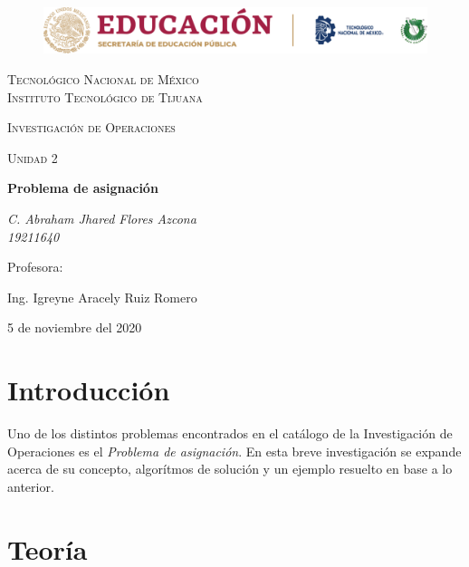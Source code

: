 \documentclass[letterpaper, 12pt]{article}
\begin{document}
    
    \begin{titlepage}
        \begin{figure}[ht]
            \centering
            \includegraphics[width=15cm]{logosITT.png}
        \end{figure}
        \centering
        {\scshape\LARGE Tecnológico Nacional de México\\Instituto Tecnológico de Tijuana\par}
        \vspace{1cm}
        {\scshape\Large Investigación de Operaciones\par}
        \vspace{1cm}
        {\scshape\Large Unidad 2\par}
        \vspace{1.5cm}
        {\huge\bfseries Problema de asignación\par}
        \vspace{2cm}
        {\Large\itshape C. Abraham Jhared Flores Azcona\\19211640\par}
        \vfill
        Profesora: \par
        Ing. Igreyne Aracely Ruiz Romero
        
        \vfill

        {\large 5 de noviembre del 2020}
    \end{titlepage}

    \newpage
    \thispagestyle{empty}
    \tableofcontents
    \listoffigures

    \newpage
    \section{Introducción}
    Uno de los distintos problemas encontrados en el catálogo de la Investigación de Operaciones es el \emph{Problema de asignación}. En esta breve investigación se expande acerca de su concepto,
    algorítmos de solución y un ejemplo resuelto en base a lo anterior. 
    \section{Teoría}
\end{document}
